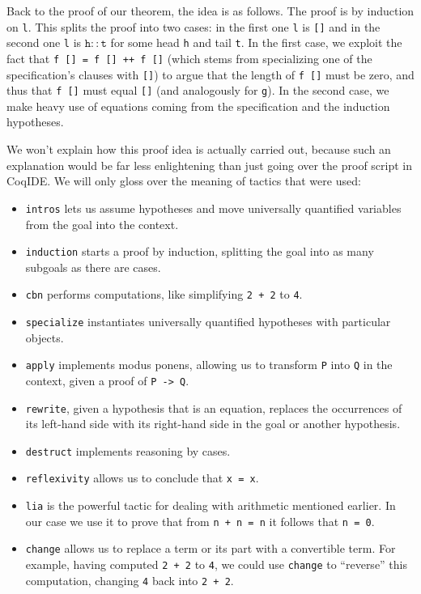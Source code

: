 \documentclass[declaration,mgr,english,shortabstract]{iithesis}
\newcommand{\m}[1]{\texttt{#1}}
\begin{document}
Back to the proof of our theorem, the idea is as follows. The proof is by induction on \m{l}. This splits the proof into two cases: in the first one \m{l} is \m{[]} and in the second one \m{l} is $\m{h} :: \m{t}$ for some head \m{h} and tail \m{t}. In the first case, we exploit the fact that \m{f [] = f [] ++ f []} (which stems from specializing one of the specification's clauses with \m{[]}) to argue that the length of \m{f []} must be zero, and thus that \m{f []} must equal \m{[]} (and analogously for \m{g}). In the second case, we make heavy use of equations coming from the specification and the induction hypotheses.

We won't explain how this proof idea is actually carried out, because such an explanation would be far less enlightening than just going over the proof script in CoqIDE. We will only gloss over the meaning of tactics that were used:

\begin{itemize}
    \item \m{intros} lets us assume hypotheses and move universally quantified variables from the goal into the context.
    \item \m{induction} starts a proof by induction, splitting the goal into as many subgoals as there are cases.
    \item \m{cbn} performs computations, like simplifying \m{2 + 2} to \m{4}.
    \item \m{specialize} instantiates universally quantified hypotheses with particular objects.
    \item \m{apply} implements modus ponens, allowing us to transform \m{P} into \m{Q} in the context, given a proof of \m{P -> Q}.
    \item \m{rewrite}, given a hypothesis that is an equation, replaces the occurrences of its left-hand side with its right-hand side in the goal or another hypothesis.
    \item \m{destruct} implements reasoning by cases.
    \item \m{reflexivity} allows us to conclude that \m{x = x}.
    \item \m{lia} is the powerful tactic for dealing with arithmetic mentioned earlier. In our case we use it to prove that from \m{n + n = n} it follows that \m{n = 0}.
    \item \m{change} allows us to replace a term or its part with a convertible term. For example, having computed \m{2 + 2} to \m{4}, we could use \m{change} to ``reverse'' this computation, changing \m{4} back into \m{2 + 2}.
\end{itemize}
\end{document}
